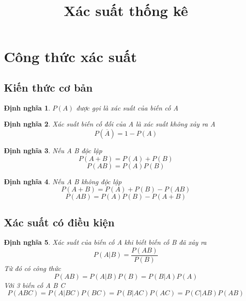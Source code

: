 \documentclass[12pt]{article}
\def\bar#1{\overline{#1}}
\newtheorem{thm}{Định nghĩa}
\begin{document}
\title{Xác suất thống kê}
\date{}
\maketitle

\section{Công thức xác suất}
\subsection{Kiến thức cơ bản}
\begin{thm}
$P(A)$ được gọi là xác suất của biến cố A
\end{thm}

\begin{thm}
Xác suất biến cố đối của A là xác suất không xảy ra A
\begin{equation}
P(\bar{A}) = 1 - P(A)
\end{equation}
\end{thm}
\begin{thm}
Nếu A B độc lập
\begin{equation}
P(A + B) = P(A) + P(B) 
\end{equation}
\begin{equation}
    P(AB) = P(A)P(B)
\end{equation}
\end{thm}

\begin{thm}
Nếu A B không độc lập
\begin{equation}
P(A + B) = P(A) + P(B) - P(AB)
\end{equation}
\begin{equation}
    P(AB) = P(A)P(B) - P(A + B)
\end{equation}
\end{thm}

\subsection{Xác suất có điều kiện}
\begin{thm}
Xác suất của biến cố A khi biết biến cố B đã xảy ra
\begin{equation}
P(A|B) = \frac{P(AB)}{P(B)}
\end{equation}
Từ đó có công thức
\begin{equation}
P(AB) = P(A|B)P(B) = P(B|A)P(A)
\end{equation}
Với 3 biến cố A B C
\begin{equation}
P(ABC) = P(A|BC)P(BC) = P(B|AC)P(AC) = P(C|AB)P(AB)
\end{equation}
\end{thm}
\end{document}

